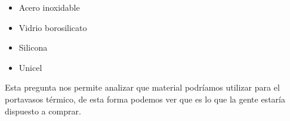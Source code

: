 
\begin{itemize}
    \item Acero inoxidable
    \item Vidrio borosilicato
    \item Silicona
    \item Unicel
\end{itemize}

Esta pregunta nos permite analizar que material podríamos utilizar para el portavasos térmico, de esta forma podemos ver que es lo que la gente estaría dispuesto a comprar.